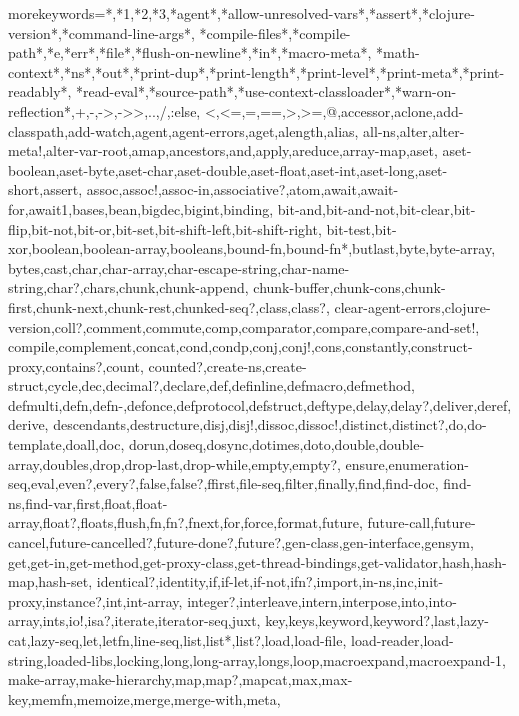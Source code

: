 %
{morekeywords={*,*1,*2,*3,*agent*,*allow-unresolved-vars*,*assert*,*clojure-version*,*command-line-args*,%
*compile-files*,*compile-path*,*e,*err*,*file*,*flush-on-newline*,*in*,*macro-meta*,%
*math-context*,*ns*,*out*,*print-dup*,*print-length*,*print-level*,*print-meta*,*print-readably*,%
*read-eval*,*source-path*,*use-context-classloader*,*warn-on-reflection*,+,-,->,->>,..,/,:else,%
<,<=,=,==,>,>=,@,accessor,aclone,add-classpath,add-watch,agent,agent-errors,aget,alength,alias,%
all-ns,alter,alter-meta!,alter-var-root,amap,ancestors,and,apply,areduce,array-map,aset,%
aset-boolean,aset-byte,aset-char,aset-double,aset-float,aset-int,aset-long,aset-short,assert,%
assoc,assoc!,assoc-in,associative?,atom,await,await-for,await1,bases,bean,bigdec,bigint,binding,%
bit-and,bit-and-not,bit-clear,bit-flip,bit-not,bit-or,bit-set,bit-shift-left,bit-shift-right,%
bit-test,bit-xor,boolean,boolean-array,booleans,bound-fn,bound-fn*,butlast,byte,byte-array,%
bytes,cast,char,char-array,char-escape-string,char-name-string,char?,chars,chunk,chunk-append,%
chunk-buffer,chunk-cons,chunk-first,chunk-next,chunk-rest,chunked-seq?,class,class?,%
clear-agent-errors,clojure-version,coll?,comment,commute,comp,comparator,compare,compare-and-set!,%
compile,complement,concat,cond,condp,conj,conj!,cons,constantly,construct-proxy,contains?,count,%
counted?,create-ns,create-struct,cycle,dec,decimal?,declare,def,definline,defmacro,defmethod,%
defmulti,defn,defn-,defonce,defprotocol,defstruct,deftype,delay,delay?,deliver,deref,derive,%
descendants,destructure,disj,disj!,dissoc,dissoc!,distinct,distinct?,do,do-template,doall,doc,%
dorun,doseq,dosync,dotimes,doto,double,double-array,doubles,drop,drop-last,drop-while,empty,empty?,%
ensure,enumeration-seq,eval,even?,every?,false,false?,ffirst,file-seq,filter,finally,find,find-doc,%
find-ns,find-var,first,float,float-array,float?,floats,flush,fn,fn?,fnext,for,force,format,future,%
future-call,future-cancel,future-cancelled?,future-done?,future?,gen-class,gen-interface,gensym,%
get,get-in,get-method,get-proxy-class,get-thread-bindings,get-validator,hash,hash-map,hash-set,%
identical?,identity,if,if-let,if-not,ifn?,import,in-ns,inc,init-proxy,instance?,int,int-array,%
integer?,interleave,intern,interpose,into,into-array,ints,io!,isa?,iterate,iterator-seq,juxt,%
key,keys,keyword,keyword?,last,lazy-cat,lazy-seq,let,letfn,line-seq,list,list*,list?,load,load-file,%
load-reader,load-string,loaded-libs,locking,long,long-array,longs,loop,macroexpand,macroexpand-1,%
make-array,make-hierarchy,map,map?,mapcat,max,max-key,memfn,memoize,merge,merge-with,meta,%
}}

